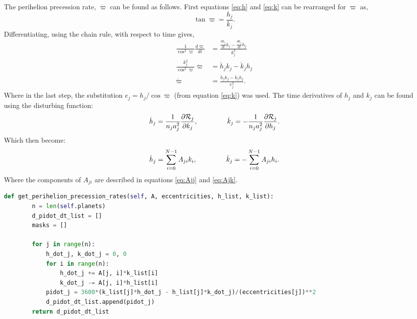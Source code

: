 \documentclass[11pt, oneside]{article}   	%
\begin{document}
The perihelion precession rate, $\dot{\varpi}$ can be found as follows. First equations \ref{eq:h} and \ref{eq:k} can be rearranged for $\varpi$ as,
\begin{equation}
\tan \varpi = \frac{h_{j}}{k_{j}}.
\end{equation}
Differentiating, using the chain rule, with respect to time gives,
\begin{equation}
   \label{eq:pidot}
   \begin{split}
   \frac{1}{\cos^{2}\varpi} \frac{d\varpi}{dt} &= \frac{\frac{dh_{j}}{dt}k_{j}-\frac{dk_{j}}{dt}h_{j}}{k_{j}^{2} }\\
   \frac{k_{j}^{2}}{\cos^{2}\varpi} \dot{\varpi} &= \dot{h}_{j}k_{j}-\dot{k}_{j}h_{j}\\
   \dot{\varpi} &= \frac{\dot{h}_{j}k_{j}-\dot{k}_{j}h_{j}}{e_{j}^{2}}.
   \end{split}
\end{equation}
Where in the last step, the substitution $e_{j} = h_{j}/\cos \varpi$ (from equation \ref{eq:k}) was used. The time derivatives of $h_{j}$ and $k_{j}$ can be found using the disturbing function:
\begin{equation}
\dot{h}_{j} = \frac{1}{n_{j}a_{j}^{2}}\frac{\partial \mathcal{R}_{j}}{\partial k_{j}},  \hspace*{1.5cm} \dot{k}_{j} = -\frac{1}{n_{j}a_{j}^{2}}\frac{\partial \mathcal{R}_{j}}{\partial h_{j}}.
\end{equation}
Which then become:
\begin{equation}
\dot{h}_{j} = \sum_{i=0}^{N-1} A_{ji}k_{i}, \hspace*{1.5cm} \dot{k}_{j} = -\sum_{i=0}^{N-1} A_{ji}h_{i}.
\end{equation}
Where the components of $A_{ji}$ are described in equations \ref{eq:Ajj} and \ref{eq:Ajk}.

\begin{lstlisting}[language=Python, caption={Calculating precession rate, $\dot{\varpi}$ of Mercury}, firstnumber=156]
    def get_perihelion_precession_rates(self, A, eccentricities, h_list, k_list):
        n = len(self.planets)
        d_pidot_dt_list = []
        masks = []

        for j in range(n):
            h_dot_j, k_dot_j = 0, 0
            for i in range(n):
                h_dot_j += A[j, i]*k_list[i]
                k_dot_j -= A[j, i]*h_list[i]
            pidot_j = 3600*(k_list[j]*h_dot_j - h_list[j]*k_dot_j)/(eccentricities[j])**2
            d_pidot_dt_list.append(pidot_j)
        return d_pidot_dt_list
\end{lstlisting}
\end{document}
